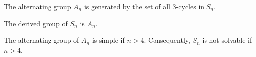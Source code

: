 \begin{lema}
    The alternating group $A_n$ is generated by the set of all 3-cycles in $S_n$.
\end{lema}
\begin{lema}
    The derived group of $S_n$ is $A_n$.
\end{lema}
\begin{teo}
    The alternating group of $A_n$ is simple if $n>4$. Consequently, $S_n$ is not solvable if $n>4$.
\end{teo}